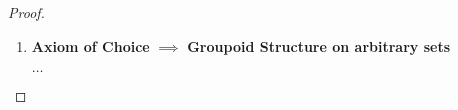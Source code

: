 \documentclass[../../main.tex]{subfiles}
\begin{document}
\begin{proof}
\begin{enumerate}
        The function $g$ maps every element $x$ of $A$ to the least pair $\left<u,\, v\right>$ in $B \times B$ satisfying $x + u = v$.
        From earlier in the proof we know that such a pair must exists and that $g$ must in fact be injective.
        This again follows from $+$ being cancellative, since if $x_1,\, x_2$ are two elements of $A$, having $f(x_1) = f(x_2)$ would imply that
        \begin{alignat*}{3}
                        x_1 + u  &= \quad \ v     &=& \ x_2 + u \\
            \iff \qquad x_1      &= \ v + u^{-1}\ &=& \ x_2     
        \end{alignat*} 
        for some pair $\left<u,\, v\right> \in D$.
        Since $\mathbf{Im}(g)$ is a subset of $D$ it itself is a well-ordered set.
        As such we can define a well-order $R''$ on $A$ by letting $x_i R'' x_j$ whenever $g(x_i) R' g(x_j)$.

        \item \textbf{Axiom of Choice} $\implies$ \textbf{Groupoid Structure on arbitrary sets}
        
        $\ldots$
    \end{enumerate}
\end{proof}
\end{document}
